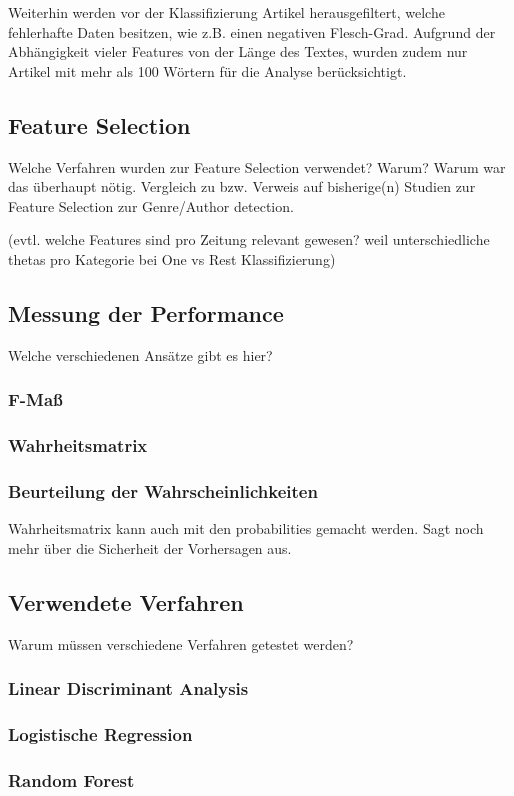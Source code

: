 Weiterhin werden vor der Klassifizierung Artikel herausgefiltert, welche fehlerhafte Daten besitzen, wie z.B. einen negativen Flesch-Grad. Aufgrund der Abhängigkeit vieler Features von der Länge des Textes, wurden zudem nur Artikel mit mehr als 100 Wörtern für die Analyse berücksichtigt.

\subsection{Feature Selection}
Welche Verfahren wurden zur Feature Selection verwendet? Warum? Warum war das überhaupt nötig. Vergleich zu bzw. Verweis auf bisherige(n) Studien zur Feature Selection zur Genre/Author detection.

(evtl. welche Features sind pro Zeitung relevant gewesen? weil unterschiedliche thetas pro Kategorie bei One vs Rest Klassifizierung)
\subsection{Messung der Performance}
Welche verschiedenen Ansätze gibt es hier?
\subsubsection*{F-Maß}
\subsubsection*{Wahrheitsmatrix}
\subsubsection*{Beurteilung der Wahrscheinlichkeiten}
Wahrheitsmatrix kann auch mit den probabilities gemacht werden. Sagt noch mehr über die Sicherheit der Vorhersagen aus.
\subsection{Verwendete Verfahren}
Warum müssen verschiedene Verfahren getestet werden?
\subsubsection*{Linear Discriminant Analysis}
\subsubsection*{Logistische Regression}
\subsubsection*{Random Forest}
